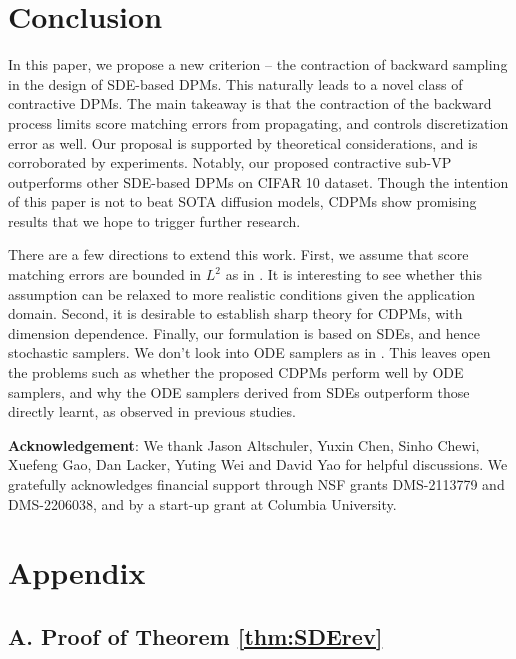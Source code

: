 \documentclass[letterpaper,11pt,reqno]{amsart}
\numberwithin{equation}{section}
\begin{document}
\section{Conclusion}
\label{sc5}

\quad In this paper,
we propose a new criterion -- 
the contraction of backward sampling
in the design of SDE-based DPMs.
This naturally leads to a novel class of contractive DPMs.
The main takeaway is that the contraction of the backward process
limits score matching errors from propagating,
and controls discretization error as well. 
Our proposal is supported by theoretical considerations,
and is corroborated by experiments. 
Notably, our proposed contractive sub-VP outperforms
other SDE-based DPMs on CIFAR 10 dataset.
Though the intention of this paper is not to beat SOTA diffusion models,
CDPMs show promising results
that we hope to trigger further research.

\quad There are a few directions to extend this work.
First, we assume that score matching errors
are bounded in $L^2$
as in \cite{Chen23, GNZ23, LLT23}.
It is interesting to see whether this assumption 
can be relaxed to more realistic conditions 
given the application domain. 
Second, it is desirable to establish sharp theory for CDPMs, with dimension dependence.
Finally, our formulation is based on SDEs,
and hence stochastic samplers.
We don't look into ODE samplers as in 
\cite{Song20,xu2022poisson,LW23, Chen23b}.
This leaves open the problems such as
whether the proposed CDPMs perform
well by ODE samplers,
and why the ODE samplers derived from SDEs
outperform those directly learnt,
as observed in previous studies.


\medskip
{\bf Acknowledgement}: 
We thank Jason Altschuler, Yuxin Chen, Sinho Chewi, Xuefeng Gao, Dan Lacker, Yuting Wei and David Yao for helpful discussions.
We gratefully acknowledges financial support through NSF grants DMS-2113779 and
DMS-2206038,
and by a start-up grant at Columbia University.

\newpage
\section*{Appendix}

\subsection*{A. Proof of Theorem \ref{thm:SDErev}}
\end{document}
